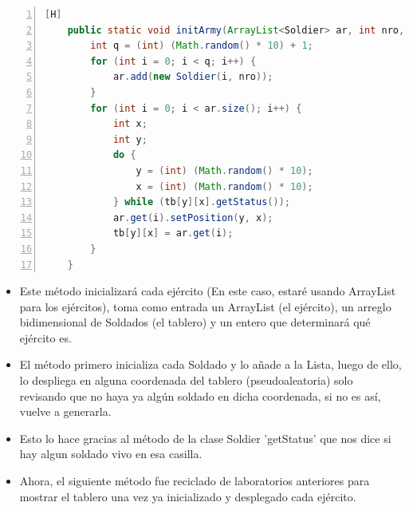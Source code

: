 \documentclass{article}
\begin{document}
	\begin{lstlisting}[language=java,caption={Primeros métodos}, numbers=left][H]
	public static void initArmy(ArrayList<Soldier> ar, int nro, Soldier[][] tb) {
        int q = (int) (Math.random() * 10) + 1;
        for (int i = 0; i < q; i++) {
            ar.add(new Soldier(i, nro));
        }
        for (int i = 0; i < ar.size(); i++) {
            int x;
            int y;
            do {
                y = (int) (Math.random() * 10);
                x = (int) (Math.random() * 10);
            } while (tb[y][x].getStatus());
            ar.get(i).setPosition(y, x);
            tb[y][x] = ar.get(i);
        }
    }
	\end{lstlisting}
	\begin{itemize}	
		\item Este método inicializará cada ejército (En este caso, estaré usando ArrayList para los ejércitos), toma como entrada un ArrayList (el ejército), un arreglo bidimensional de Soldados (el tablero) y un entero que determinará qué ejército es. 
		\item El método primero inicializa cada Soldado y lo añade a la Lista, luego de ello, lo despliega en alguna coordenada del tablero (pseudoaleatoria) solo revisando que no haya ya algún soldado en dicha coordenada, si no es así, vuelve a generarla.
		\item Esto lo hace gracias al método de la clase Soldier 'getStatus' que nos dice si hay algun soldado vivo en esa casilla.
		\item Ahora, el siguiente método fue reciclado de laboratorios anteriores para mostrar el tablero una vez ya inicializado y desplegado cada ejército.
	\end{itemize}
\end{document}
